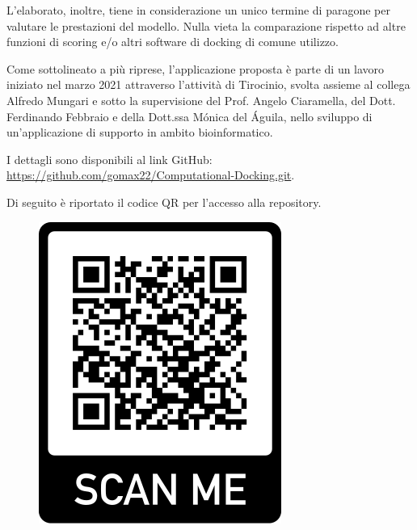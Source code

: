\noindent L'elaborato, inoltre, tiene in considerazione un unico termine di paragone per valutare le prestazioni del modello. Nulla vieta la comparazione rispetto ad altre funzioni di scoring e/o altri software di docking di comune utilizzo.

\noindent Come sottolineato a più riprese, l'applicazione proposta è parte di un lavoro iniziato nel marzo 2021 attraverso l'attività di Tirocinio, svolta assieme al collega Alfredo Mungari e sotto la supervisione del Prof. Angelo Ciaramella, del Dott. Ferdinando Febbraio e della Dott.ssa Mónica del Águila, nello sviluppo di un'applicazione di supporto in ambito bioinformatico.

\noindent I dettagli sono disponibili al link GitHub:\\ \url{https://github.com/gomax22/Computational-Docking.git}.


\noindent Di seguito è riportato il codice QR per l'accesso alla repository.

\vskip 1.5cm
\begin{figure}[H]
    \centering
    \includegraphics[scale=0.5]{images/frame.png}
\end{figure}


